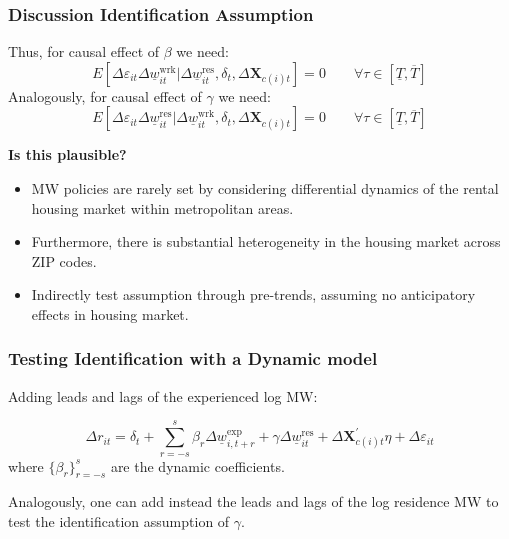 \documentclass[aspectratio=169, t]{beamer}
\newcommand{\MW}{\underline{w}}
\begin{document}
\begin{frame}
    \frametitle{Discussion Identification Assumption}
    
    Thus, for causal effect of $\beta$ we need:
    $$
    E \left[\Delta \varepsilon_{it} \Delta \MW^{\text{wrk}}_{it}  
    \big| \Delta \MW^{\text{res}}_{it}, \delta_t, \Delta 
    \mathbf{X}_{c(i)t} \right] = 0
    \quad \quad \forall \tau \in \left[ \underline{T}, \overline{T} \right]
    $$
    \vspace{.5mm}
    Analogously, for causal effect of $\gamma$ we need:
    $$
    E \left[\Delta \varepsilon_{it} \Delta \MW^{\text{res}}_{it}  
    \big| \Delta \MW^{\text{wrk}}_{it}, \delta_t, \Delta \mathbf{X}_{c(i)t} 
    \right] = 0
    \quad \quad \forall \tau \in \left[ \underline{T}, \overline{T} \right]
    $$
    
    \pause
    \vspace{.5mm}
    \textbf{Is this plausible?}
    \begin{itemize} \small
        \vspace{.5mm}
        \item MW policies are rarely set by considering differential dynamics of the 
        rental housing market within metropolitan areas.
        
        \vspace{.5mm}
        \item Furthermore, there is substantial heterogeneity in the housing market 
        across ZIP codes.
        
        \vspace{.5mm}
        \item Indirectly test assumption through pre-trends, assuming no anticipatory 
        effects in housing market.
    \end{itemize}
\end{frame}


\begin{frame}[label = dyn_model]
    \frametitle{Testing Identification with a Dynamic model}
    
    Adding leads and lags of the experienced log MW:
    
    $$
    \Delta r_{it} = \delta_t
        + \sum_{r=-s}^{s} \beta_r \Delta \MW^{\text{exp}}_{i,t+r}
        + \gamma \Delta \MW^{\text{res}}_{it}
        + \Delta \mathbf{X}^{'}_{c(i)t}\eta
        + \Delta \varepsilon_{it}
    $$    
    where $\{\beta_r\}_{r=-s}^{s}$ are the dynamic coefficients.
    
    \vspace{3mm}

    Analogously, one can add instead the leads and lags of the log residence MW
    to test the identification assumption of $\gamma$.
\end{frame}
\end{document}
